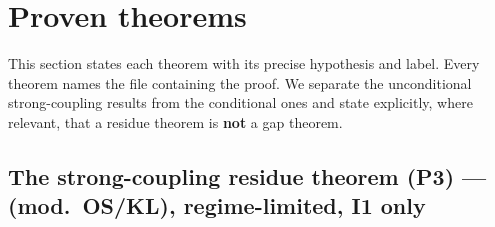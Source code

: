 \section{Proven theorems}
\label{sec:theorems}

This section states each theorem with its precise hypothesis and label. Every theorem names the
file containing the proof. We separate the unconditional strong-coupling results from the
conditional ones and state explicitly, where relevant, that a residue theorem is \textbf{not} a
gap theorem.

\subsection{The strong-coupling residue theorem (P3) --- \LT{} (mod.\ OS/KL), regime-limited, I1 only}


